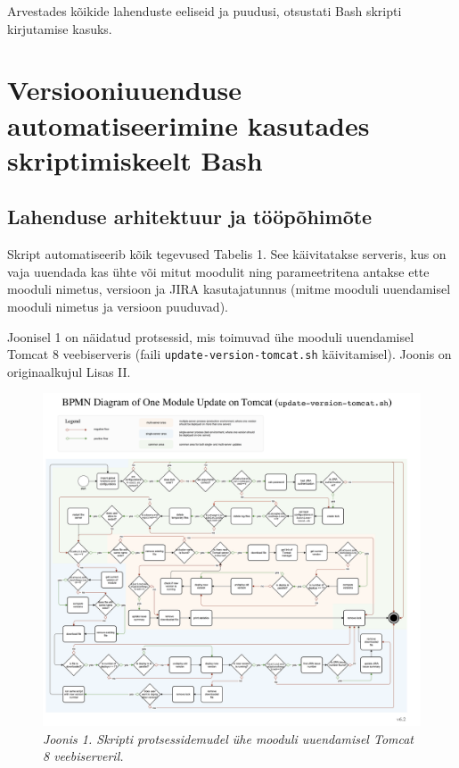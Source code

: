 \documentclass[12pt]{article}
\newcommand{\code}[1]{\texttt{#1}}
\begin{document}
  Arvestades kõikide lahenduste eeliseid ja puudusi, otsustati Bash skripti kirjutamise kasuks.
  
  \newpage
  
  \section{Versiooniuuenduse automatiseerimine kasutades skriptimiskeelt Bash}
  
  \subsection{Lahenduse arhitektuur ja tööpõhimõte}
  
  Skript automatiseerib kõik tegevused Tabelis 1. See käivitatakse serveris, kus on vaja uuendada kas ühte või mitut moodulit ning parameetritena antakse ette mooduli nimetus, versioon ja JIRA kasutajatunnus (mitme mooduli uuendamisel mooduli nimetus ja versioon puuduvad).
  
  Joonisel 1 on näidatud protsessid, mis toimuvad ühe mooduli uuendamisel Tomcat 8 veebiserveris (faili \code{update-version-tomcat.sh} käivitamisel). Joonis on originaalkujul Lisas II.
   
   \begin{figure}[H]
     \begin{center}
       \includegraphics[width=.8\textwidth]{diagrams/BPMN-diagram-one-module-tomcat.png}
       \caption*{\textit{Joonis 1. Skripti protsessidemudel ühe mooduli uuendamisel Tomcat 8 veebiserveril.}}
     \end{center}
   \end{figure}
   
\end{document}
